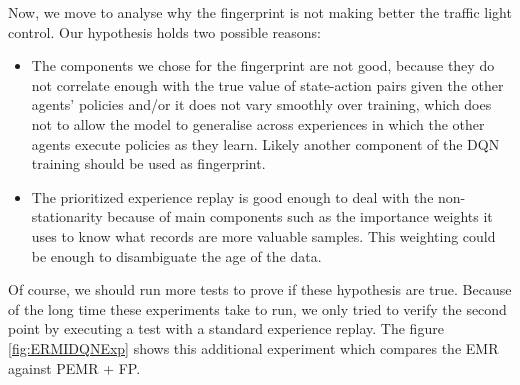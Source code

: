 \documentclass{llncs}
\begin{document}
Now, we move to analyse why the fingerprint is not making better the traffic light control. Our hypothesis holds two possible reasons:  

\begin{itemize}
\item The components we chose for the fingerprint are not good, because they do not correlate enough with the true value of state-action pairs given the other agents' policies and/or it does not vary smoothly over training, which does not to allow the model to generalise across experiences in which the other agents execute policies as they learn. Likely another component of the DQN training should be used as fingerprint.
\item The prioritized experience replay is good enough to deal with the non-stationarity because of main components such as the importance weights it uses to know what records are more valuable samples. This weighting could be enough to disambiguate the age of the data.
\end{itemize}

Of course, we should run more tests to prove if these hypothesis are true. Because of the long time these experiments take to run, we only tried to verify the second point by executing a test with a standard experience replay. The figure \ref{fig:ERMIDQNExp} shows this additional experiment which compares the EMR against PEMR + FP.
\end{document}
